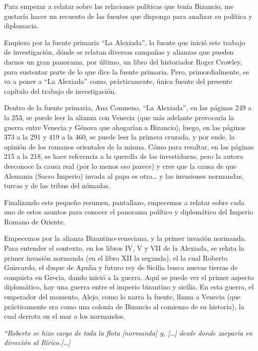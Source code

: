 Para empezar a relatar sobre las relaciones políticas que tenía Bizancio,
me gustaría hacer un recuento de las fuentes que dispongo para analizar
su política y diplomacia.

Empiezo por la fuente primaria “La Alexiada”, 
la fuente que inició este trabajo de investigación, 
dónde se relatan diversas campañas y alianzas 
que pueden darnos un gran panorama, 
por último, un libro del historiador Roger Crowley, 
para sustentar parte de lo que dice la fuente primaria. 
Pero, primordialmente, 
se va a poner a “La Alexiada” como, prácticamente, 
única fuente del presente capítulo del trabajo de investigación.

Dentro de la fuente primaria,  Ana Comneno, “La Alexiada”,
en las páginas 249 a la 253, 
se puede leer la alianza con Venecia (que más adelante provocaría 
la guerra entre Venecia y Génova que ahogarían a Bizancio), luego, 
en las páginas 373 a la 291 y 419 a la 460, se puede leer la 
primera cruzada, y por ende, la opinión de los romanos 
orientales de la misma. Cómo para resaltar, en las páginas 
215 a la 218, se hace referencia a la querella de las investiduras, 
pero la autora desconoce la causa real (por lo menos eso parece) 
y cree que la causa de que Alemania (Sacro Imperio) invada al 
papa es otra… y las invasiones normandas, 
turcas y de las tribus del nómadas. 

Finalizando este pequeño resumen, pantallazo, empecemos a 
relatar sobre cada uno de estos asuntos para conocer el 
panorama político y diplomático del Imperio Romano de Oriente.

Empecemos por la alianza Bizantino-veneciana, y la primer 
invasión normanda. Para entender el contexto, en los libros 
IV, V y VII de la Alexiada, se relata la primer invasión normanda 
(en el libro XII la segunda), el la cual Roberto Guiscardo, 
el duque de Apulia y futuro rey de Sicilia busca nuevas tierras de 
conquista en Grecia, dando inició a la guerra. Aquí se puede ver el 
primer aspecto diplomático, hay una guerra entre el imperio bizantino 
y sicilia. En esta guerra, el emperador del momento, Alejo, 
como lo narra la fuente, llama a Venecia (que prácticamente 
era como una colonia de Bizancio al comienzo de su historia), 
la cual derrota en el mar a los normandos.

\textit{“Roberto se hizo cargo de toda la flota [normanda] y, 
[…] desde donde zarparía en dirección al Ilírico.[…]}

